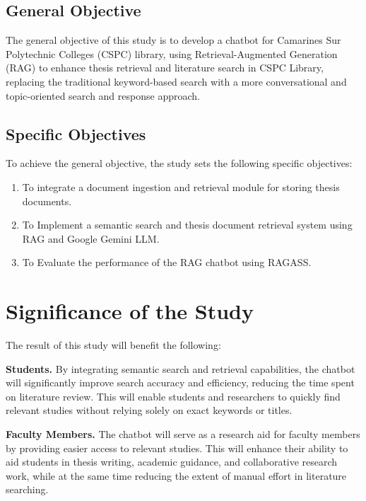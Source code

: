 \begin{refsection}
\subsection{General Objective}
The general objective of this study is to develop a chatbot for  Camarines Sur Polytechnic Colleges (CSPC) library, using Retrieval-Augmented Generation (RAG) to enhance thesis retrieval and literature search in CSPC Library, replacing the traditional keyword-based search with a more conversational and topic-oriented search and response approach.

\subsection{Specific Objectives}

To achieve the general objective, the study sets the following specific objectives:
\begin{enumerate}

    \item To integrate a document ingestion and retrieval module for storing thesis documents.
    \item To Implement a semantic search and thesis document retrieval system using RAG and Google Gemini LLM.
    \item To Evaluate the performance of the RAG chatbot using RAGASS.

\end{enumerate}


\clearpage
\section{Significance of the Study}

The result of this study will benefit the following:

\bigbreak
\noindent \textbf{Students.}  By integrating semantic search and retrieval capabilities, the chatbot will significantly improve search accuracy and efficiency, reducing the time spent on literature review. This will enable students and researchers to quickly find relevant studies without relying solely on exact keywords or titles.

\bigbreak
\noindent \textbf{Faculty Members.}  The chatbot will serve as a research aid for faculty members by providing easier access to relevant studies. This will enhance their ability to aid students in thesis writing, academic guidance, and collaborative research work, while at the same time reducing the extent of manual effort in literature searching.


\end{refsection}
